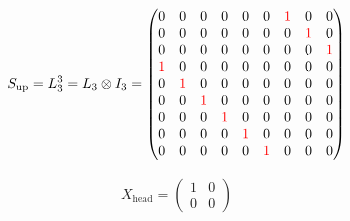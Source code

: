 \begin{align}
  S_{\text{up}} = L_3^3 = L_3 \otimes I_3 =
  \begin{pmatrix}
    0                  & 0                  & 0                  & 0                  & 0                  & 0                  & \textcolor{red}{1} & 0                  & 0                  \\
    0                  & 0                  & 0                  & 0                  & 0                  & 0                  & 0                  & \textcolor{red}{1} & 0                  \\
    0                  & 0                  & 0                  & 0                  & 0                  & 0                  & 0                  & 0                  & \textcolor{red}{1} \\
    \textcolor{red}{1} & 0                  & 0                  & 0                  & 0                  & 0                  & 0                  & 0                  & 0                  \\
    0                  & \textcolor{red}{1} & 0                  & 0                  & 0                  & 0                  & 0                  & 0                  & 0                  \\
    0                  & 0                  & \textcolor{red}{1} & 0                  & 0                  & 0                  & 0                  & 0                  & 0                  \\
    0                  & 0                  & 0                  & \textcolor{red}{1} & 0                  & 0                  & 0                  & 0                  & 0                  \\
    0                  & 0                  & 0                  & 0                  & \textcolor{red}{1} & 0                  & 0                  & 0                  & 0                  \\
    0                  & 0                  & 0                  & 0                  & 0                  & \textcolor{red}{1} & 0                  & 0                  & 0
  \end{pmatrix}
\end{align}

\begin{align}
  X_{\text{head}} =
  \begin{pmatrix}
    1 & 0 \\
    0 & 0
  \end{pmatrix}
\end{align}

